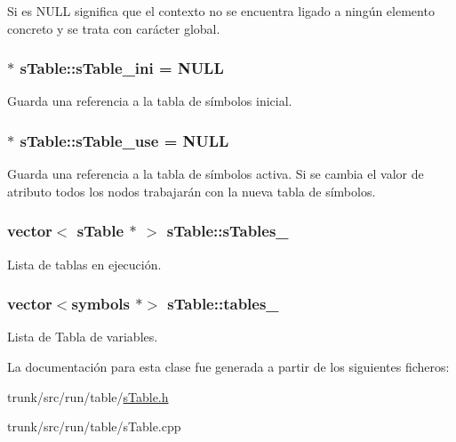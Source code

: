 Si es N\-U\-L\-L significa que el contexto no se encuentra ligado a ningún elemento concreto y se trata con carácter global. \hypertarget{classsTable_a8c9904b43ec79f00b72d19b7e93fe80e}{
\subsubsection[{s\-Table\-\_\-ini}]{ $\ast$ s\-Table\-::s\-Table\-\_\-ini = N\-U\-L\-L\hspace{0.3cm}{\ttfamily [static]}}}\label{classsTable_a8c9904b43ec79f00b72d19b7e93fe80e}
Guarda una referencia a la tabla de símbolos inicial. \hypertarget{classsTable_a80ddd01254b180d81bf0264e353bf7eb}{
\subsubsection[{s\-Table\-\_\-use}]{ $\ast$ s\-Table\-::s\-Table\-\_\-use = N\-U\-L\-L\hspace{0.3cm}{\ttfamily [static]}}}\label{classsTable_a80ddd01254b180d81bf0264e353bf7eb}
Guarda una referencia a la tabla de símbolos activa. Si se cambia el valor de atributo todos los nodos trabajarán con la nueva tabla de símbolos. \hypertarget{classsTable_a4f5d3240bb31d3f77e72e81d4c18cdf4}{
\subsubsection[{s\-Tables\-\_\-}]{\setlength{\rightskip}{0pt plus 5cm}vector$<$ {\bf s\-Table} $\ast$ $>$ s\-Table\-::s\-Tables\-\_\-\hspace{0.3cm}{\ttfamily [static]}}}\label{classsTable_a4f5d3240bb31d3f77e72e81d4c18cdf4}
Lista de tablas en ejecución. \hypertarget{classsTable_a826fb8438b2b8475ef3328b0f0342fd2}{
\subsubsection[{tables\-\_\-}]{\setlength{\rightskip}{0pt plus 5cm}vector$<${\bf symbols} $\ast$$>$ s\-Table\-::tables\-\_\-}}\label{classsTable_a826fb8438b2b8475ef3328b0f0342fd2}
Lista de Tabla de variables. 

La documentación para esta clase fue generada a partir de los siguientes ficheros\-:\begin{DoxyCompactItemize}
\item 
trunk/src/run/table/\hyperlink{sTable_8h}{s\-Table.\-h}\item 
trunk/src/run/table/s\-Table.\-cpp\end{DoxyCompactItemize}
